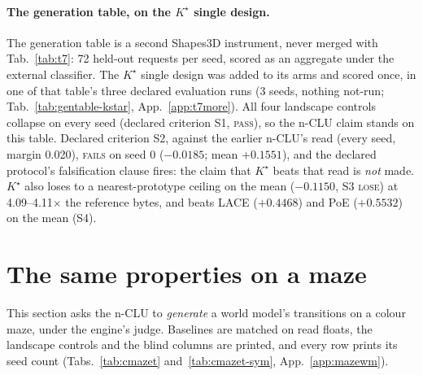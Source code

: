 \documentclass{article} %
\newcommand{\Kstar}{\ensuremath{K^{\star}}}
\begin{document}
\paragraph{The generation table, on the $\Kstar$ single design.}
The generation table is a second Shapes3D instrument, never merged with Tab.~\ref{tab:t7}: 72 %
held-out requests per seed, scored as an aggregate under the external classifier. The $\Kstar$ single design was added
to its arms and scored once, in one of that table's three declared evaluation runs (3 seeds,
nothing not-run; Tab.~\ref{tab:gentable-kstar}, %
App.~\ref{app:t7more}). All four landscape controls collapse on every seed (declared criterion S1, %
\textsc{pass}), so the n-CLU claim stands on this table. Declared criterion S2, against the earlier
n-CLU's read (every seed, margin 0.020), \textsc{fails} on seed 0 ($-0.0185$; mean $+0.1551$), and the %
declared protocol's falsification clause fires: the claim that $\Kstar$ beats that read is
\emph{not} made. $\Kstar$ also loses to a nearest-prototype ceiling on the mean %
($-0.1150$, S3 \textsc{lose}) at 4.09--4.11$\times$ the reference bytes, and beats LACE %
($+0.4468$) and PoE ($+0.5532$) on the mean (S4). %

\section{The same properties on a maze}
\label{sec:maze}\label{sec:maze-wm}

This section asks the n-CLU to \emph{generate} a world model's transitions on a colour maze, under
the engine's judge. Baselines are matched on read floats, the landscape controls and the blind columns
are printed, and every row prints its seed count (Tabs.~\ref{tab:cmazet} and~\ref{tab:cmazet-sym},
App.~\ref{app:mazewm}).
\end{document}
